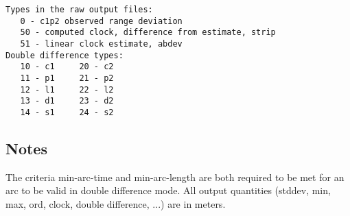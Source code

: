 \begin{\outputsize}
\begin{verbatim}
Types in the raw output files:
   0 - c1p2 observed range deviation
   50 - computed clock, difference from estimate, strip
   51 - linear clock estimate, abdev
Double difference types:
   10 - c1     20 - c2
   11 - p1     21 - p2
   12 - l1     22 - l2
   13 - d1     23 - d2
   14 - s1     24 - s2
\end{verbatim}
\end{\outputsize}

\subsection{Notes}
The criteria min-arc-time and min-arc-length are both required to be met
for an arc to be valid in double difference mode.
All output quantities (stddev, min, max, ord, clock, double difference, ...)
are in meters.

%

